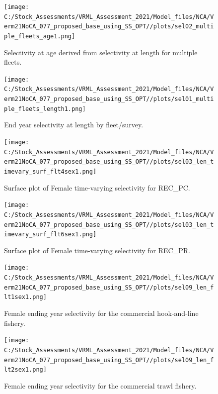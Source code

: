 \documentclass[
  english,
  a4paper,
]{article}
\begin{document}
\clearpage
\FloatBarrier

\FloatBarrier

\begin{figure}
\centering
\texttt{[image: C:/Stock\_Assessments/VRML\_Assessment\_2021/Model\_files/NCA/Verm21NoCA\_077\_proposed\_base\_using\_SS\_OPT//plots/sel02\_multiple\_fleets\_age1.png]}
\caption{Selectivity at age derived from selectivity at length for multiple fleets.\label{fig:selex-age-all}}
\end{figure}

\FloatBarrier

\begin{figure}
\centering
\texttt{[image: C:/Stock\_Assessments/VRML\_Assessment\_2021/Model\_files/NCA/Verm21NoCA\_077\_proposed\_base\_using\_SS\_OPT//plots/sel01\_multiple\_fleets\_length1.png]}
\caption{End year selectivity at length by fleet/survey.\label{fig:selex-length-all}}
\end{figure}

\FloatBarrier

\begin{figure}
\centering
\texttt{[image: C:/Stock\_Assessments/VRML\_Assessment\_2021/Model\_files/NCA/Verm21NoCA\_077\_proposed\_base\_using\_SS\_OPT//plots/sel03\_len\_timevary\_surf\_flt4sex1.png]}
\caption{Surface plot of Female time-varying selectivity for REC\_PC.\label{fig:sel03_len_timevary_surf_flt4sex1}}
\end{figure}

\begin{figure}
\centering
\texttt{[image: C:/Stock\_Assessments/VRML\_Assessment\_2021/Model\_files/NCA/Verm21NoCA\_077\_proposed\_base\_using\_SS\_OPT//plots/sel03\_len\_timevary\_surf\_flt6sex1.png]}
\caption{Surface plot of Female time-varying selectivity for REC\_PR.\label{fig:sel03_len_timevary_surf_flt6sex1}}
\end{figure}

\FloatBarrier

\FloatBarrier

\begin{figure}
\centering
\texttt{[image: C:/Stock\_Assessments/VRML\_Assessment\_2021/Model\_files/NCA/Verm21NoCA\_077\_proposed\_base\_using\_SS\_OPT//plots/sel09\_len\_flt1sex1.png]}
\caption{Female ending year selectivity for the commercial hook-and-line fishery.\label{fig:endyr-selex-COM-HKL}}
\end{figure}

\begin{figure}
\centering
\texttt{[image: C:/Stock\_Assessments/VRML\_Assessment\_2021/Model\_files/NCA/Verm21NoCA\_077\_proposed\_base\_using\_SS\_OPT//plots/sel09\_len\_flt2sex1.png]}
\caption{Female ending year selectivity for the commercial trawl fishery.\label{fig:endyr-selex-COM-TWL}}
\end{figure}
\end{document}
